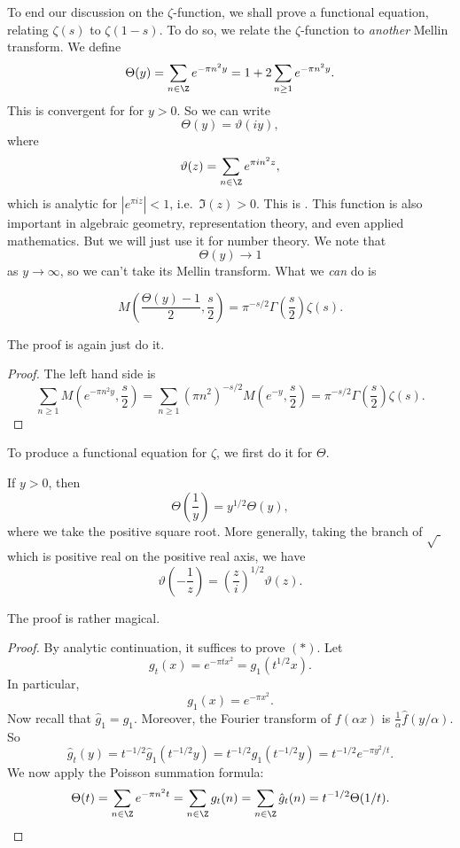 \documentclass[a4paper]{article}
\begin{document}
To end our discussion on the $\zeta$-function, we shall prove a functional equation, relating $\zeta(s)$ to $\zeta(1 - s)$. To do so, we relate the $\zeta$-function to \emph{another} Mellin transform. We define\index{$\Theta$}
\[
  \Theta(y) = \sum_{n \in \Z} e^{-\pi n^2 y} = 1 + 2 \sum_{n \geq 1} e^{-\pi n^2 y}.
\]
This is convergent for for $y > 0$. So we can write\index{$\vartheta$}
\[
  \Theta(y) = \vartheta(iy),
\]
where
\[
  \vartheta(z) = \sum_{n \in \Z} e^{\pi i n^2 z},
\]
which is analytic for $|e^{\pi i z}| < 1$, i.e.\ $\Im(z) > 0$. This is . This function is also important in algebraic geometry, representation theory, and even applied mathematics. But we will just use it for number theory. We note that
\[
  \Theta(y) \to 1
\]
as $y \to \infty$, so we can't take its Mellin transform. What we \emph{can} do is
\begin{prop}
  \[
    M\left(\frac{\Theta(y) - 1}{2}, \frac{s}{2}\right) = \pi^{-s/2} \Gamma\left(\frac{s}{2}\right) \zeta(s).
  \]
\end{prop}

The proof is again just do it.
\begin{proof}
  The left hand side is
  \[
    \sum_{n \geq 1} M\left(e^{-\pi n^2 y}, \frac{s}{2}\right) = \sum_{n \geq 1} (\pi n^2) ^{-s/2} M\left(e^{-y}, \frac{s}{2}\right) = \pi^{-s/2} \Gamma\left(\frac{s}{2}\right) \zeta(s).
  \]
\end{proof}

To produce a functional equation for $\zeta$, we first do it for $\Theta$.

\begin{thm}
  If $y > 0$, then
  \[
    \Theta\left(\frac{1}{y}\right) = y^{1/2} \Theta(y)\tag{$*$},
  \]
  where we take the positive square root. More generally, taking the branch of $\sqrt{\;}$ which is positive real on the positive real axis, we have
  \[
    \vartheta \left(-\frac{1}{z}\right) = \left(\frac{z}{i}\right)^{1/2} \vartheta(z).
  \]
\end{thm}

The proof is rather magical.
\begin{proof}
  By analytic continuation, it suffices to prove $(*)$. Let
  \[
    g_t(x) = e^{-\pi t x^2} = g_1(t^{1/2} x).
  \]
  In particular,
  \[
    g_1(x) = e^{-\pi x^2}.
  \]
  Now recall that $\hat{g}_1 = g_1$. Moreover, the Fourier transform of $f(\alpha x)$ is $\frac{1}{\alpha} \hat{f}(y/\alpha)$. So
  \[
    \hat{g}_t(y) = t^{-1/2} \hat{g}_1(t^{-1/2} y) = t^{-1/2} g_1(t^{-1/2} y) = t^{-1/2} e^{-\pi y^2/t}.
  \]
  We now apply the Poisson summation formula:
  \[
    \Theta(t) = \sum_{n \in \Z} e^{-\pi n^2 t} = \sum_{n \in \Z} g_t(n) = \sum_{n \in \Z} \hat{g}_t(n) = t^{-1/2} \Theta(1/t).\qedhere
  \]
\end{proof}
\end{document}
